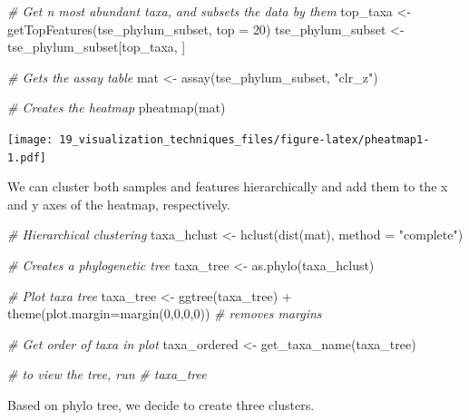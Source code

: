 \documentclass[
]{book}
\newenvironment{Shaded}{\begin{snugshade}}{\end{snugshade}}
\newcommand{\AttributeTok}[1]{\textcolor[rgb]{0.77,0.63,0.00}{#1}}
\newcommand{\CommentTok}[1]{\textcolor[rgb]{0.56,0.35,0.01}{\textit{#1}}}
\newcommand{\DecValTok}[1]{\textcolor[rgb]{0.00,0.00,0.81}{#1}}
\newcommand{\FunctionTok}[1]{\textcolor[rgb]{0.00,0.00,0.00}{#1}}
\newcommand{\NormalTok}[1]{#1}
\newcommand{\OtherTok}[1]{\textcolor[rgb]{0.56,0.35,0.01}{#1}}
\newcommand{\SpecialCharTok}[1]{\textcolor[rgb]{0.00,0.00,0.00}{#1}}
\newcommand{\StringTok}[1]{\textcolor[rgb]{0.31,0.60,0.02}{#1}}
\begin{document}
\begin{Shaded}
\begin{Highlighting}[]
\CommentTok{\# Get n most abundant taxa, and subsets the data by them}
\NormalTok{top\_taxa }\OtherTok{\textless{}{-}} \FunctionTok{getTopFeatures}\NormalTok{(tse\_phylum\_subset, }\AttributeTok{top =} \DecValTok{20}\NormalTok{)}
\NormalTok{tse\_phylum\_subset }\OtherTok{\textless{}{-}}\NormalTok{ tse\_phylum\_subset[top\_taxa, ]}

\CommentTok{\# Gets the assay table}
\NormalTok{mat }\OtherTok{\textless{}{-}} \FunctionTok{assay}\NormalTok{(tse\_phylum\_subset, }\StringTok{"clr\_z"}\NormalTok{)}

\CommentTok{\# Creates the heatmap}
\FunctionTok{pheatmap}\NormalTok{(mat)}
\end{Highlighting}
\end{Shaded}

\texttt{[image: 19\_visualization\_techniques\_files/figure-latex/pheatmap1-1.pdf]}

We can cluster both samples and features hierarchically and add them to the
x and y axes of the heatmap, respectively.

\begin{Shaded}
\begin{Highlighting}[]
\CommentTok{\# Hierarchical clustering}
\NormalTok{taxa\_hclust }\OtherTok{\textless{}{-}} \FunctionTok{hclust}\NormalTok{(}\FunctionTok{dist}\NormalTok{(mat), }\AttributeTok{method =} \StringTok{"complete"}\NormalTok{)}

\CommentTok{\# Creates a phylogenetic tree}
\NormalTok{taxa\_tree }\OtherTok{\textless{}{-}} \FunctionTok{as.phylo}\NormalTok{(taxa\_hclust)}

\CommentTok{\# Plot taxa tree}
\NormalTok{taxa\_tree }\OtherTok{\textless{}{-}} \FunctionTok{ggtree}\NormalTok{(taxa\_tree) }\SpecialCharTok{+} 
  \FunctionTok{theme}\NormalTok{(}\AttributeTok{plot.margin=}\FunctionTok{margin}\NormalTok{(}\DecValTok{0}\NormalTok{,}\DecValTok{0}\NormalTok{,}\DecValTok{0}\NormalTok{,}\DecValTok{0}\NormalTok{)) }\CommentTok{\# removes margins}

\CommentTok{\# Get order of taxa in plot}
\NormalTok{taxa\_ordered }\OtherTok{\textless{}{-}} \FunctionTok{get\_taxa\_name}\NormalTok{(taxa\_tree)}

\CommentTok{\# to view the tree, run}
\CommentTok{\# taxa\_tree}
\end{Highlighting}
\end{Shaded}

Based on phylo tree, we decide to create three clusters.
\end{document}
